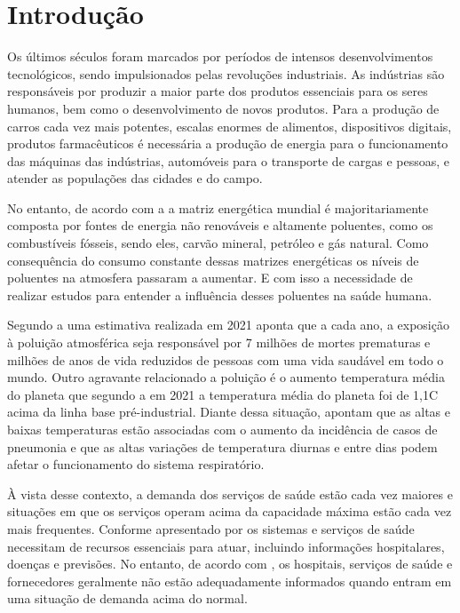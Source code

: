 \documentclass[
  12pt,		%
  a4paper,	%
  openright,%
  oneside,	%
  chapter=TITLE,		%
  section=TITLE,		%
  english,	%
  french,	%
  spanish,	%
  brazil	%
]{abntex2}
\begin{document}
    \textual
    \pagestyle{simple} 
    
    
    \chapter{Introdução}
    Os últimos séculos foram marcados por períodos de intensos desenvolvimentos tecnológicos, sendo impulsionados
    pelas revoluções industriais. As indústrias são responsáveis por produzir a maior
    parte dos produtos essenciais para os seres humanos, bem como o desenvolvimento de novos produtos.
    Para a produção de carros cada vez mais potentes, escalas enormes de alimentos, dispositivos digitais, produtos farmacêuticos
    é necessária a produção de energia para o funcionamento das máquinas das indústrias, automóveis para o transporte de cargas e pessoas,
    e atender as populações das cidades e do campo.

    No entanto, de acordo com a \cite[]{iea} a matriz energética mundial é majoritariamente
    composta por fontes de energia não renováveis e altamente poluentes, como os combustíveis
    fósseis, sendo eles, carvão mineral, petróleo e gás natural. 
    Como consequência do consumo constante dessas matrizes energéticas os níveis de poluentes na atmosfera
    passaram a aumentar. E com isso a necessidade de realizar estudos para entender a influência
    desses poluentes na saúde humana.

    Segundo a \cite[]{diretrizes_oms} uma estimativa realizada em 2021 aponta que a cada ano, a exposição
    à poluição atmosférica seja responsável por 7 milhões de mortes prematuras e milhões de anos de vida
    reduzidos de pessoas com uma vida saudável em todo o mundo. Outro agravante relacionado a poluição é o aumento
    temperatura média do planeta que segundo a \cite[]{temperatura_onu} em 2021 a temperatura média do planeta foi de 1,1\degree C acima
    da linha base pré-industrial. Diante dessa situação, \cite[]{pneumonia_temperatura} apontam que as altas e baixas temperaturas
    estão associadas com o aumento da incidência de casos de pneumonia e que as altas variações de temperatura diurnas e entre dias
    podem afetar o funcionamento do sistema respiratório.

    À vista desse contexto, a demanda dos serviços de saúde estão cada vez maiores e situações em que os serviços operam acima da capacidade
    máxima estão cada vez mais frequentes. Conforme apresentado por \cite[]{Health} os sistemas e serviços de saúde necessitam de recursos essenciais
    para atuar, incluindo informações hospitalares, doenças e previsões. No entanto, de acordo com \cite[]{forcasting_health}, os hospitais, serviços de saúde
    e fornecedores geralmente não estão adequadamente informados quando entram em uma situação de demanda acima do normal.
    
\end{document}
